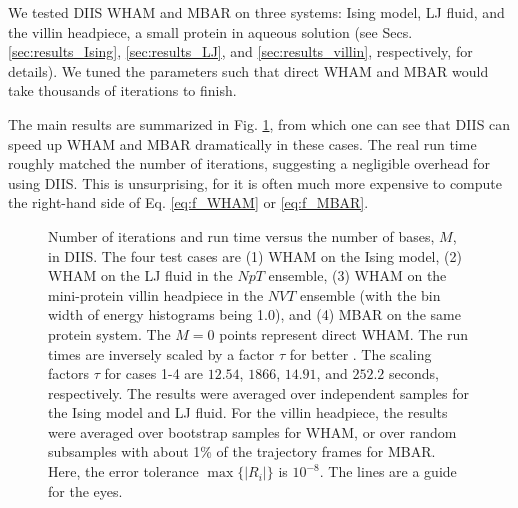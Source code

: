 \documentclass[aip,jcp,preprint,superscriptaddress]{revtex4-1}
\begin{document}
We tested DIIS WHAM and MBAR on three systems:
Ising model, LJ fluid,
and the villin headpiece, a small protein in aqueous solution
(see Secs.
\ref{sec:results_Ising}, \ref{sec:results_LJ}, and
\ref{sec:results_villin},
respectively,
for details).
%
We tuned the parameters
such that direct WHAM and MBAR
would take thousands of iterations
to finish.



The main results
are summarized
in Fig. \ref{fig:nsnt},
from which one can see that
DIIS can speed up WHAM and MBAR
dramatically in these cases.
%
The real run time roughly matched
the number of iterations,
suggesting a negligible overhead for using DIIS.
%
This is unsurprising,
for it is often much more expensive to compute
the right-hand side of
Eq. \eqref{eq:f_WHAM} or \eqref{eq:f_MBAR}.



\begin{figure}[h]
  \caption{
    \label{fig:nsnt}
    Number of iterations
    and run time
    versus the number of bases, $M$,
    in DIIS.
    The four test cases are
    (1) WHAM on the Ising model,
    (2) WHAM on the LJ fluid in the $NpT$ ensemble,
    (3) WHAM on the mini-protein villin headpiece in the $NVT$ ensemble
    (with the bin width of energy histograms being 1.0), and
    (4) MBAR on the same protein system.
    The $M = 0$ points represent direct WHAM.
    The run times are inversely scaled
    by a factor $\tau$
    for better .
    The scaling factors $\tau$ for cases 1-4 are
    $12.54$, $1866$, $14.91$, and $252.2$ seconds,
    respectively.
    The results were averaged
    over independent samples
    for the Ising model and LJ fluid.
    For the villin headpiece,
    the results were averaged over
    bootstrap\cite{
    newman, efron1979, hub2010}
    samples for WHAM,
    or over random subsamples with about 1\% of the trajectory frames
    for MBAR.
    Here, the error tolerance
    $\max \{ |R_i| \}$ is $10^{-8}$.
    The lines are a guide for the eyes.
  }
\end{figure}
\end{document}
